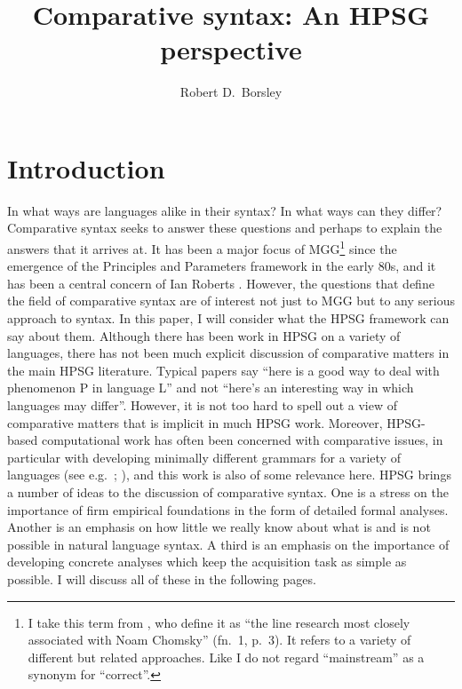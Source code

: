 \documentclass[output=paper]{langsci/langscibook}
\author{Robert D.\ Borsley\affiliation{University of Essex and Bangor
University}}
\title{Comparative syntax: An HPSG perspective}
\begin{document}
\glsresetall

\section{Introduction}

In what ways are languages alike in their syntax? In what ways can they differ?
Comparative syntax seeks to answer these questions and perhaps to explain the
answers that it arrives at. It has been a major focus of \gls{MGG}\footnote{I
    take this term from \citet{CulJac2005}, who define it as \enquote{the line
    research most closely associated with Noam Chomsky} (fn.\ 1, p.\ 3). It refers
    to a variety of different but related approaches. Like
    \citeauthor{CulJac2005} I do not regard \enquote{mainstream} as a synonym for
\enquote{correct}.} since the emergence of the Principles and Parameters framework in
the early 80s, and it has been a central concern of Ian Roberts \parencite[see
e.g.][]{Roberts1997,Roberts2007}. However, the questions that define the field
of comparative syntax are of interest not just to \gls{MGG} but to any serious
approach to syntax. In this paper, I will consider what the \gls{HPSG}
framework can say about them. Although there has been work in \gls{HPSG} on a
variety of languages, there has not been much explicit discussion of
comparative matters in the main \gls{HPSG} literature. Typical papers say
\enquote{here is a good way to deal with phenomenon P in language L} and not
\enquote{here’s an interesting way in which languages may differ}. However, it
is not too hard to spell out a view of comparative matters that is implicit in
much \gls{HPSG} work.  Moreover, \gls{HPSG}-based computational work has often
been concerned with comparative issues, in particular with developing minimally
different grammars for a variety of languages (see e.g.~\citealt{Muller2015};
\citealt{BenDreFokPouSal2010,Bender2016}), and this work is also of some relevance
here. \gls{HPSG} brings a number of ideas to the discussion of comparative
syntax. One is a stress on the importance of firm empirical foundations in the
form of detailed formal analyses. Another is an emphasis on how little we
really know about what is and is not possible in natural language syntax. A
third is an emphasis on the importance of developing concrete analyses which
keep the acquisition task as simple as possible. I will discuss all of these in
the following pages.
\end{document}
